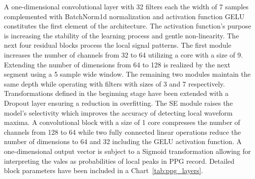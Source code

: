 \documentclass[journal]{IEEEtran}
\begin{document}
A one-dimensional convolutional layer with 32 filters each the width of 7 samples complemented with BatchNorm1d normalization and activation function GELU constitutes the first element of the architecture. The activation function's purpose is increasing the stability of the learning process and gentle non-linearity. The next four residual blocks process the local signal patterns. The first module increases the number of channels from 32 to 64 utilizing a core with a size of 9. Extending the number of dimensions from 64 to 128 is realized by the next segment using a 5 sample wide window. The remaining two modules maintain the same depth while operating with filters with sizes of 3 and 7 respectively. Transformations defined in the beginning stage have been extended with a Dropout layer ensuring a reduction in overfitting.
\newpage
The SE module raises the model's selectivity which improves the accuracy of detecting local waveform maxima. A convolutional block with a size of 1 core compresses the number of channels from 128 to 64 while two fully connected linear operations reduce the number of dimensions to 64 and 32 including the GELU activation function. A one-dimensional output vector is subject to a Sigmoid transformation allowing for interpreting the vales as probabilities of local peaks in PPG record. Detailed block parameters have been included in a Chart~\ref{tab:ppg_layers}.
\end{document}

